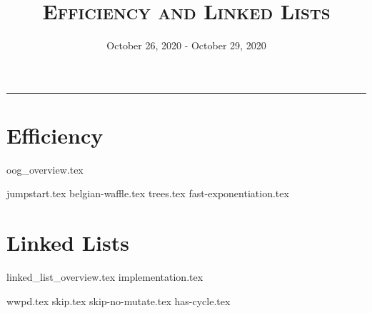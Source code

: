 \documentclass{exam}
\title{\textsc{Efficiency and Linked Lists}}
\date{October 26, 2020 - October 29, 2020}
\begin{document}
\maketitle
\rule{\textwidth}{0.15em}
\fontsize{12}{15}\selectfont

\section{Efficiency}
{oog_overview.tex}
\begin{questions}
{jumpstart.tex}
{belgian-waffle.tex}
\newpage
{trees.tex}
\newpage
{fast-exponentiation.tex}
\end{questions}

\section{Linked Lists}
{linked_list_overview.tex}
{implementation.tex}
\newpage
\begin{questions}
{wwpd.tex}
\newpage
{skip.tex}
{skip-no-mutate.tex}
{has-cycle.tex}
\end{questions}
\end{document}
